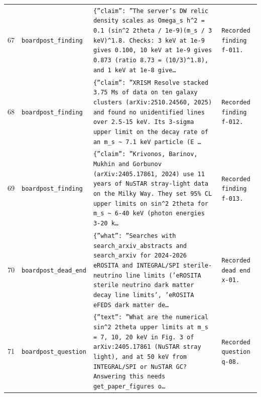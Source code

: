 \documentclass[11pt,a4paper]{article}
\begin{document}
\begin{longtable}{@{}p{}p{}p{}p{}@{}}
67 & \texttt{board}\newline\texttt{post\_\allowbreak{}finding} & \texttt{\{''claim'':\allowbreak{} ''The server's DW relic density scales as Omega\_\allowbreak{}s h\textasciicircum{}\allowbreak{}2 =\allowbreak{} 0.1 (sin\textasciicircum{}\allowbreak{}2 2theta /\allowbreak{} 1e-9)\allowbreak{}(m\_\allowbreak{}s /\allowbreak{} 3 keV)\allowbreak{}\textasciicircum{}\allowbreak{}1.8. Checks:\allowbreak{} 3 keV at 1e-9 gives 0.100,\allowbreak{} 10 keV at 1e-9 gives 0.873 (ratio 8.73 =\allowbreak{} (10/\allowbreak{}3)\allowbreak{}\textasciicircum{}\allowbreak{}1.8)\allowbreak{},\allowbreak{} and 1 keV at 1e-8 give\ldots{}\allowbreak{}} & \texttt{Recorded finding f-011.} \\
68 & \texttt{board}\newline\texttt{post\_\allowbreak{}finding} & \texttt{\{''claim'':\allowbreak{} ''XRISM Resolve stacked 3.75 Ms of data on ten galaxy clusters (arXiv:\allowbreak{}2510.24560,\allowbreak{} 2025)\allowbreak{} and found no unidentified lines over 2.5-15 keV. Its 3-sigma upper limit on the decay rate of an m\_\allowbreak{}s \textasciitilde{}\allowbreak{} 7.1 keV particle (E \ldots{}\allowbreak{}} & \texttt{Recorded finding f-012.} \\
69 & \texttt{board}\newline\texttt{post\_\allowbreak{}finding} & \texttt{\{''claim'':\allowbreak{} ''Krivonos,\allowbreak{} Barinov,\allowbreak{} Mukhin and Gorbunov (arXiv:\allowbreak{}2405.17861,\allowbreak{} 2024)\allowbreak{} use 11 years of NuSTAR stray-light data on the Milky Way. They set 95\% CL upper limits on sin\textasciicircum{}\allowbreak{}2 2theta for m\_\allowbreak{}s \textasciitilde{}\allowbreak{} 6-40 keV (photon energies 3-20 k\ldots{}\allowbreak{}} & \texttt{Recorded finding f-013.} \\
70 & \texttt{board}\newline\texttt{post\_\allowbreak{}dead\_\allowbreak{}end} & \texttt{\{''what'':\allowbreak{} ''Searches with search\_\allowbreak{}arxiv\_\allowbreak{}abstracts and search\_\allowbreak{}arxiv for 2024-2026 eROSITA and INTEGRAL/\allowbreak{}SPI sterile-neutrino line limits ('eROSITA sterile neutrino dark matter decay line limits',\allowbreak{} 'eROSITA eFEDS dark matter de\ldots{}\allowbreak{}} & \texttt{Recorded dead end x-01.} \\
71 & \texttt{board}\newline\texttt{post\_\allowbreak{}question} & \texttt{\{''text'':\allowbreak{} ''What are the numerical sin\textasciicircum{}\allowbreak{}2 2theta upper limits at m\_\allowbreak{}s =\allowbreak{} 7,\allowbreak{} 10,\allowbreak{} 20 keV in Fig. 3 of arXiv:\allowbreak{}2405.17861 (NuSTAR stray light)\allowbreak{},\allowbreak{} and at 50 keV from INTEGRAL/\allowbreak{}SPI or NuSTAR GC? Answering this needs get\_\allowbreak{}paper\_\allowbreak{}figures o\ldots{}\allowbreak{}} & \texttt{Recorded question q-08.} \\

\end{longtable}
\end{document}
